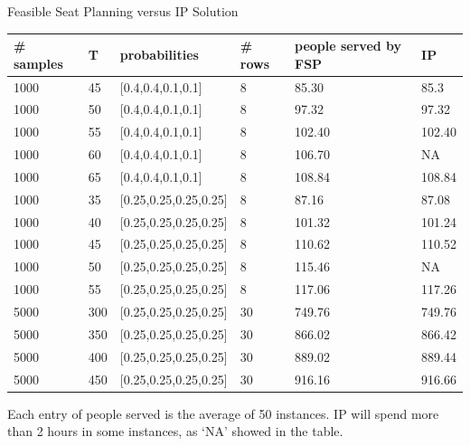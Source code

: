     \begin{frame}{Feasible Seat Planning versus IP Solution}
        \scriptsize
        \begin{table}[ht]
            \begin{tabular}{|l|l|l|l|l|l|}
            \hline
            \# samples & T & probabilities & \# rows & people served by FSP & IP \\
            \hline
            1000  & 45  & [0.4,0.4,0.1,0.1] & 8 & 85.30 & 85.3 \\
            1000  & 50  & [0.4,0.4,0.1,0.1] & 8 & 97.32 & 97.32 \\
            1000  & 55  & [0.4,0.4,0.1,0.1] & 8 & 102.40 & 102.40  \\ %
            1000  & 60  & [0.4,0.4,0.1,0.1] & 8 & 106.70 & NA  \\
            1000  & 65  & [0.4,0.4,0.1,0.1] & 8 & 108.84 & 108.84 \\
            \hline
            1000  & 35  & [0.25,0.25,0.25,0.25] & 8 & 87.16 & 87.08 \\
            1000  & 40  & [0.25,0.25,0.25,0.25] & 8 & 101.32 & 101.24 \\
            1000  & 45  & [0.25,0.25,0.25,0.25] & 8 & 110.62 & 110.52 \\
            1000  & 50  & [0.25,0.25,0.25,0.25] & 8 & 115.46 & NA \\
            1000  & 55  & [0.25,0.25,0.25,0.25] & 8 & 117.06 & 117.26 \\
            \hline
            5000  & 300  & [0.25,0.25,0.25,0.25] & 30 & 749.76 & 749.76 \\
            5000  & 350  & [0.25,0.25,0.25,0.25] & 30 & 866.02 & 866.42 \\
            5000  & 400  & [0.25,0.25,0.25,0.25] & 30 & 889.02 & 889.44 \\
            5000  & 450  & [0.25,0.25,0.25,0.25] & 30 & 916.16 & 916.66 \\
            \hline
            \end{tabular}
        \end{table}

    Each entry of people served is the average of 50 instances.
    IP will spend more than 2 hours in some instances, as `NA' showed in the table.
    \end{frame}
      
